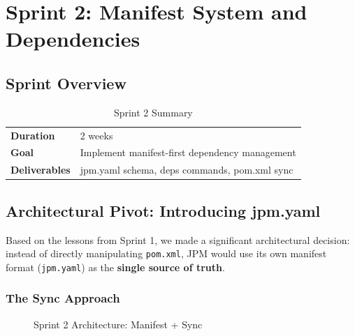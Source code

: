 \documentclass[12pt,a4paper]{report}
\begin{document}
\chapter{Sprint 2: Manifest System and Dependencies}

\section{Sprint Overview}

\begin{table}[H]
\centering
\begin{tabular}{ll}
\toprule
\textbf{Duration} & 2 weeks \\
\textbf{Goal} & Implement manifest-first dependency management \\
\textbf{Deliverables} & jpm.yaml schema, deps commands, pom.xml sync \\
\bottomrule
\end{tabular}
\caption{Sprint 2 Summary}
\end{table}

\section{Architectural Pivot: Introducing jpm.yaml}

Based on the lessons from Sprint 1, we made a significant architectural decision: instead of directly manipulating \texttt{pom.xml}, JPM would use its own manifest format (\texttt{jpm.yaml}) as the \textbf{single source of truth}.

\subsection{The Sync Approach}

\begin{figure}[H]
\centering
{}
\caption{Sprint 2 Architecture: Manifest + Sync}
\end{figure}
\end{document}
